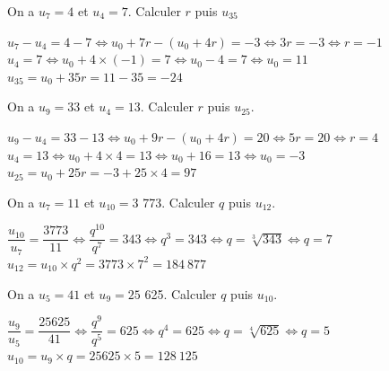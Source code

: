 \documentclass[12pt,a4paper]{article}  %
\begin{document}
\begin{enumMet}
    \item On a $u_{7}=4$ et $u_{4}=7$. Calculer $r$ puis $u_{35}$\\
    \begin{corrBox}
        $u_7-u_4=4-7 \iff u_0+7r-(u_0+4r)=-3 \iff 3r=-3 \iff r=-1$ \quad{}\\
        $u_4=7\iff u_0+4\times(-1)=7\iff u_0-4=7 \iff u_0=11$\\
        $u_{35}=u_0+35r=11-35=-24$ \quad{}
    \end{corrBox}
    \item On a $u_{9}=33$ et $u_{4}=13$. Calculer $r$ puis $u_{25}$.\\
    \begin{corrBox}
        $u_9-u_4=33-13 \iff u_0+9r-(u_0+4r)=20 \iff 5r=20 \iff r=4$ \quad{}\\
        $u_4=13\iff u_0+4\times4=13\iff u_0+16=13 \iff u_0=-3$\\
        $u_25=u_0+25r=-3+25\times4=97$ \quad{}
    \end{corrBox}
\end{enumMet}

\begin{enumMet}
    \item On a $u_{7}=11$ et $u_{10}=3$ 773. Calculer $q$ puis $u_{12}$.\\
    \begin{corrBox}
        $\dfrac{u_{10}}{u_7}=\dfrac{3773}{11}\iff \dfrac{q^{10}}{q^7}=343\iff q^3=343 \iff q=\sqrt[3]{343}\iff q=7$ \quad{}\\
        $u_{12}=u_{10}\times q^2=3773\times 7^2 = 184\ 877$ \quad{}
    \end{corrBox}
    \item On a $u_{5}=41$ et $u_{9}=25$ 625. Calculer $q$ puis $u_{10}$.\\
    \begin{corrBox}
        $\dfrac{u_{9}}{u_5}=\dfrac{25625}{41}\iff \dfrac{q^{9}}{q^5}=625\iff q^4=625 \iff q=\sqrt[4]{625}\iff q=5$ \quad{}\\
        $u_{10}=u_{9}\times q=25625\times 5 = 128\ 125$ \quad{}
    \end{corrBox}
\end{enumMet}
\end{document}
